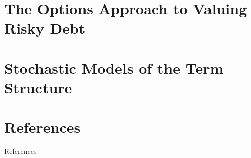 \documentclass[
14pt,notheorems,hyperref={pdfauthor=whatever}
]{beamer}
\begin{document}
\section{The Options Approach to Valuing Risky Debt}


\section{Stochastic Models of the Term Structure}


\section*{References}
\begin{frame}[allowframebreaks]{References}
    \printbibliography
\end{frame}
\end{document}
